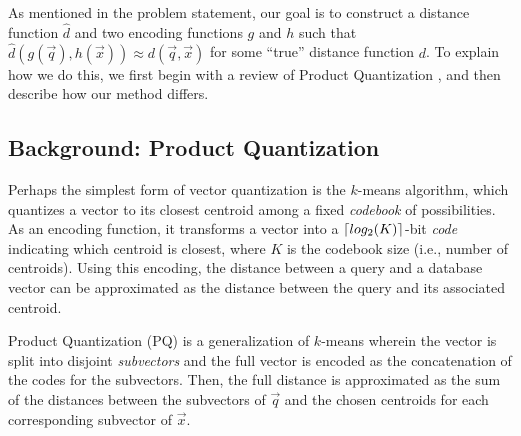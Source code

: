 
As mentioned in the problem statement, our goal is to construct a distance function $\hat{d}$ and two encoding functions $g$ and $h$ such that $\hat{d}(g(\vec{q}), h(\vec{x})) \approx d(\vec{q}, \vec{x})$ for some ``true'' distance function $d$. To explain how we do this, we first begin with a review of Product Quantization \cite{pq}, and then describe how our method differs.

\subsection{Background: Product Quantization}

Perhaps the simplest form of vector quantization is the $k$-means algorithm, which quantizes a vector to its closest centroid among a fixed \textit{codebook} of possibilities. As an encoding function, it transforms a vector into a $\lceil log_2(K)\rceil$-bit \textit{code} indicating which centroid is closest, where $K$ is the codebook size (i.e., number of centroids). Using this encoding, the distance between a query and a database vector can be approximated as the distance between the query and its associated centroid.

Product Quantization (PQ) is a generalization of $k$-means wherein the vector is split into disjoint \textit{subvectors} and the full vector is encoded as the concatenation of the codes for the subvectors. Then, the full distance is approximated as the sum of the distances between the subvectors of $\vec{q}$ and the chosen centroids for each corresponding subvector of $\vec{x}$.

